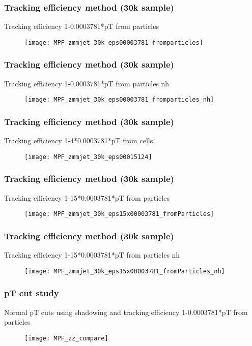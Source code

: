\documentclass{beamer}
\begin{document}
\begin{frame}
\frametitle{Tracking efficiency method (30k sample)}
Tracking efficiency 1-0.0003781*pT from particles
\begin{figure}[H]
\texttt{[image: MPF\_zmmjet\_30k\_eps00003781\_fromparticles]}
\centering
\end{figure}
\end{frame}

\begin{frame}
\frametitle{Tracking efficiency method (30k sample)}
Tracking efficiency 1-0.0003781*pT from particles nh
\begin{figure}[H]
\texttt{[image: MPF\_zmmjet\_30k\_eps00003781\_fromparticles\_nh]}
\centering
\end{figure}
\end{frame}


\begin{frame}
\frametitle{Tracking efficiency method (30k sample)}
Tracking efficiency 1-4*0.0003781*pT from cells
\begin{figure}[H]
\texttt{[image: MPF\_zmmjet\_30k\_eps00015124]}
\centering
\end{figure}
\end{frame}

\begin{frame}
\frametitle{Tracking efficiency method (30k sample)}
Tracking efficiency 1-15*0.0003781*pT from particles
\begin{figure}[H]
\texttt{[image: MPF\_zmmjet\_30k\_eps15x00003781\_fromParticles]}
\centering
\end{figure}
\end{frame}

\begin{frame}
\frametitle{Tracking efficiency method (30k sample)}
Tracking efficiency 1-15*0.0003781*pT from particles nh
\begin{figure}[H]
\texttt{[image: MPF\_zmmjet\_30k\_eps15x00003781\_fromParticles\_nh]}
\centering
\end{figure}
\end{frame}

\begin{frame}
\frametitle{pT cut study}
Normal pT cuts using shadowing and tracking efficiency 1-0.0003781*pT from particles
\begin{figure}[H]
\texttt{[image: MPF\_zz\_compare]}
\centering
\end{figure}
\end{frame}
\end{document}
